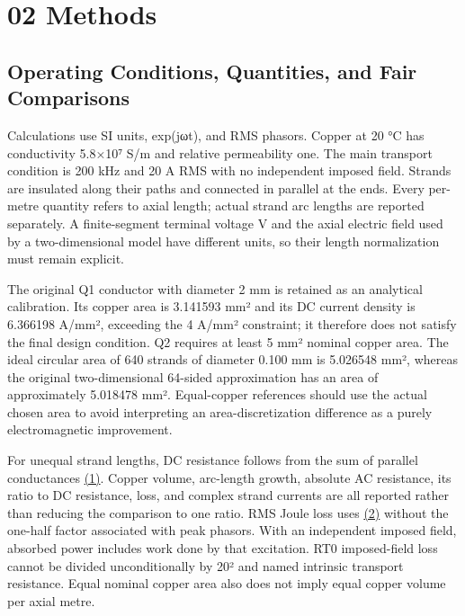 \documentclass[journal,10pt]{IEEEtran}
\begin{document}
\FloatBarrier
\section*{02 Methods}
\hypertarget{chapter-02}{}
\subsection*{Operating Conditions, Quantities, and Fair Comparisons}
\hypertarget{02.conventions.heading}{}
Calculations use SI units, exp(jωt), and RMS phasors. Copper at 20 °C has conductivity 5.8×10⁷ S/m and relative permeability one. The main transport condition is 200 kHz and 20 A RMS with no independent imposed field. Strands are insulated along their paths and connected in parallel at the ends. Every per-metre quantity refers to axial length; actual strand arc lengths are reported separately. A finite-segment terminal voltage V and the axial electric field used by a two-dimensional model have different units, so their length normalization must remain explicit.


The original Q1 conductor with diameter 2 mm is retained as an analytical calibration. Its copper area is 3.141593 mm² and its DC current density is 6.366198 A/mm², exceeding the 4 A/mm² constraint; it therefore does not satisfy the final design condition. Q2 requires at least 5 mm² nominal copper area. The ideal circular area of 640 strands of diameter 0.100 mm is 5.026548 mm², whereas the original two-dimensional 64-sided approximation has an area of approximately 5.018478 mm². Equal-copper references should use the actual chosen area to avoid interpreting an area-discretization difference as a purely electromagnetic improvement.


For unequal strand lengths, DC resistance follows from the sum of parallel conductances \href{paper_en_ieee.pdf#E01}{(1)}. Copper volume, arc-length growth, absolute AC resistance, its ratio to DC resistance, loss, and complex strand currents are all reported rather than reducing the comparison to one ratio. RMS Joule loss uses \href{paper_en_ieee.pdf#E02}{(2)} without the one-half factor associated with peak phasors. With an independent imposed field, absorbed power includes work done by that excitation. RT0 imposed-field loss cannot be divided unconditionally by 20² and named intrinsic transport resistance. Equal nominal copper area also does not imply equal copper volume per axial metre.
\end{document}
